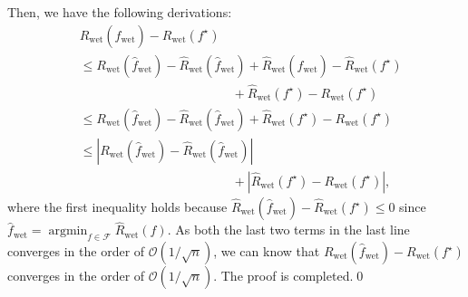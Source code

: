 \documentclass[letterpaper]{article} %
\newcommand{\argmin}{\mathop{\arg\min}}
\begin{document}
Then, we have the following derivations:
\begin{align}
\nonumber
&R_{\mathrm{wet}}(\widehat{f}_{\mathrm{wet}})-R_{\mathrm{wet}}(f^\star)\\
\nonumber
&\leq R_{\mathrm{wet}}(\widehat{f}_{\mathrm{wet}}) - \widehat{R}_{\mathrm{wet}}(\widehat{f}_{\mathrm{wet}}) + \widehat{R}_{\mathrm{wet}}(\widehat{f}_{\mathrm{wet}}) - \widehat{R}_{\mathrm{wet}}(f^\star) \\
\nonumber
&\qquad\qquad\qquad\qquad\qquad\qquad
+ \widehat{R}_{\mathrm{wet}}(f^\star) - R_{\mathrm{wet}}(f^\star)\\
\nonumber
&\leq R_{\mathrm{wet}}(\widehat{f}_{\mathrm{wet}}) - \widehat{R}_{\mathrm{wet}}(\widehat{f}_{\mathrm{wet}}) + \widehat{R}_{\mathrm{wet}}(f^\star) - R_{\mathrm{wet}}(f^\star)\\
\nonumber
&\leq \left|R_{\mathrm{wet}}(\widehat{f}_{\mathrm{wet}}) - \widehat{R}_{\mathrm{wet}}(\widehat{f}_{\mathrm{wet}})\right|\\
\nonumber
&\qquad\qquad\qquad\qquad\qquad\qquad+ \left|\widehat{R}_{\mathrm{wet}}(f^\star) - R_{\mathrm{wet}}(f^\star)\right|,
\end{align}
where the first inequality holds because $\widehat{R}_{\mathrm{wet}}(\widehat{f}_{\mathrm{wet}}) - \widehat{R}_{\mathrm{wet}}(f^\star)\leq 0$ since $\widehat{f}_{\mathrm{wet}}=\argmin_{f\in\mathcal{F}}\widehat{R}_{\mathrm{wet}}(f)$. As both the last two terms in the last line converges in the order of $\mathcal{O}(1/\sqrt{n})$, we can know that $R_{\mathrm{wet}}(\widehat{f}_{\mathrm{wet}})-R_{\mathrm{wet}}(f^\star)$ converges in the order of $\mathcal{O}(1/\sqrt{n})$.
The proof is completed.\qed
\end{document}
